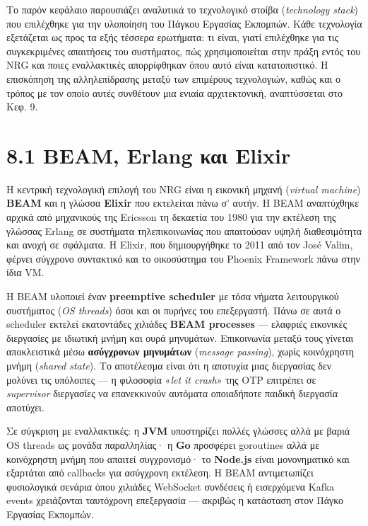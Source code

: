 Το παρόν κεφάλαιο παρουσιάζει αναλυτικά το τεχνολογικό στοίβα
(\emph{technology stack}) που επιλέχθηκε για την υλοποίηση του Πάγκου
Εργασίας Εκπομπών. Κάθε τεχνολογία εξετάζεται ως προς τα εξής τέσσερα
ερωτήματα: τι είναι, γιατί επιλέχθηκε για τις συγκεκριμένες απαιτήσεις
του συστήματος, πώς χρησιμοποιείται στην πράξη εντός του NRG και ποιες
εναλλακτικές απορρίφθηκαν όπου αυτό είναι κατατοπιστικό. Η επισκόπηση
της αλληλεπίδρασης μεταξύ των επιμέρους τεχνολογιών, καθώς και ο τρόπος
με τον οποίο αυτές συνθέτουν μια ενιαία αρχιτεκτονική, αναπτύσσεται στο
Κεφ. 9.

\section{8.1 BEAM, Erlang και
Elixir}\label{beam-erlang-ux3baux3b1ux3b9-elixir}

Η κεντρική τεχνολογική επιλογή του NRG είναι η εικονική μηχανή
(\emph{virtual machine}) \textbf{BEAM} και η γλώσσα \textbf{Elixir} που
εκτελείται πάνω σ' αυτήν. Η BEAM αναπτύχθηκε αρχικά από μηχανικούς της
Ericsson τη δεκαετία του 1980 για την εκτέλεση της γλώσσας Erlang σε
συστήματα τηλεπικοινωνίας που απαιτούσαν υψηλή διαθεσιμότητα και ανοχή
σε σφάλματα. Η Elixir, που δημιουργήθηκε το 2011 από τον José Valim,
φέρνει σύγχρονο συντακτικό και το οικοσύστημα του Phoenix Framework πάνω
στην ίδια VM.

Η BEAM υλοποιεί έναν \textbf{preemptive scheduler} με τόσα νήματα
λειτουργικού συστήματος (\emph{OS threads}) όσοι και οι πυρήνες του
επεξεργαστή. Πάνω σε αυτά ο scheduler εκτελεί εκατοντάδες χιλιάδες
\textbf{BEAM processes} --- ελαφριές εικονικές διεργασίες με ιδιωτική
μνήμη και ουρά μηνυμάτων. Επικοινωνία μεταξύ τους γίνεται αποκλειστικά
μέσω \textbf{ασύγχρονων μηνυμάτων} (\emph{message passing}), χωρίς
κοινόχρηστη μνήμη (\emph{shared state}). Το αποτέλεσμα είναι ότι η
αποτυχία μιας διεργασίας δεν μολύνει τις υπόλοιπες --- η φιλοσοφία
«\emph{let it crash}» της OTP επιτρέπει σε \emph{supervisor} διεργασίες
να επανεκκινούν αυτόματα οποιαδήποτε παιδική διεργασία αποτύχει.

Σε σύγκριση με εναλλακτικές: η \textbf{JVM} υποστηρίζει πολλές γλώσσες
αλλά με βαριά OS threads ως μονάδα παραλληλίας· η \textbf{Go} προσφέρει
goroutines αλλά με κοινόχρηστη μνήμη που απαιτεί συγχρονισμό· το
\textbf{Node.js} είναι μονονηματικό και εξαρτάται από callbacks για
ασύγχρονη εκτέλεση. Η BEAM αντιμετωπίζει φυσιολογικά σενάρια όπου
χιλιάδες WebSocket συνδέσεις ή εισερχόμενα Kafka events χρειάζονται
ταυτόχρονη επεξεργασία --- ακριβώς η κατάσταση στον Πάγκο Εργασίας
Εκπομπών.

